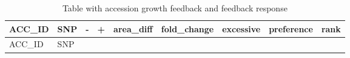 \documentclass[
  11pt,
]{article}
\begin{document}
\begin{longtable}[]{@{}
  >{\raggedleft\arraybackslash}p{}
  >{\raggedright\arraybackslash}p{}
  >{\raggedleft\arraybackslash}p{}
  >{\raggedleft\arraybackslash}p{}
  >{\raggedleft\arraybackslash}p{}
  >{\raggedleft\arraybackslash}p{}
  >{\raggedright\arraybackslash}p{}
  >{\raggedright\arraybackslash}p{}
  >{\raggedleft\arraybackslash}p{}@{}}
\caption{Table with accession growth feedback and feedback
response}\tabularnewline
\toprule\noalign{}
\begin{minipage}[b]{\linewidth}\raggedleft
ACC\_ID
\end{minipage} & \begin{minipage}[b]{\linewidth}\raggedright
SNP
\end{minipage} & \begin{minipage}[b]{\linewidth}\raggedleft
-
\end{minipage} & \begin{minipage}[b]{\linewidth}\raggedleft
+
\end{minipage} & \begin{minipage}[b]{\linewidth}\raggedleft
area\_diff
\end{minipage} & \begin{minipage}[b]{\linewidth}\raggedleft
fold\_change
\end{minipage} & \begin{minipage}[b]{\linewidth}\raggedright
excessive
\end{minipage} & \begin{minipage}[b]{\linewidth}\raggedright
preference
\end{minipage} & \begin{minipage}[b]{\linewidth}\raggedleft
rank
\end{minipage} \\
\midrule\noalign{}
\endfirsthead
\toprule\noalign{}
\begin{minipage}[b]{\linewidth}\raggedleft
ACC\_ID
\end{minipage} & \begin{minipage}[b]{\linewidth}\raggedright
SNP
\end{minipage} & \begin{minipage}[b]{\linewidth}\raggedleft

\end{minipage}
\end{longtable}
\end{document}
